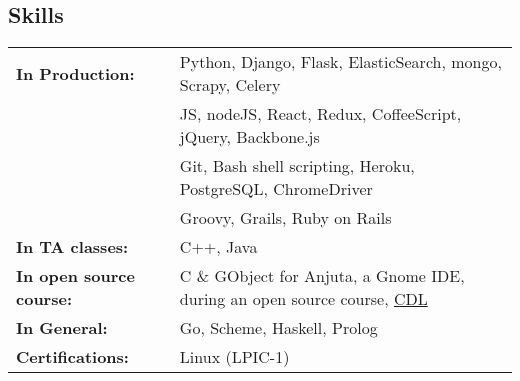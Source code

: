 \documentclass[line, margin]{resume}
\begin{document}
\begin{resume}
\section{Skills}

\begin{tabular}[t]{@{} p{1.7in} p{3.8in} @{}}
\bf{In Production:} & Python, Django, Flask, ElasticSearch, mongo, Scrapy, Celery\\
    				& JS, nodeJS, React, Redux, CoffeeScript, jQuery, Backbone.js\\
                    & Git, Bash shell scripting, Heroku, PostgreSQL, ChromeDriver\\
                    & Groovy, Grails, Ruby on Rails\\
\bf{In TA classes:} & C++, Java\\
\bf{In open source course:} & C \& GObject for Anjuta, a Gnome IDE, during an open source course, \href{http://cdl.rosedu.org/}{CDL}\\
\bf{In General:} & Go, Scheme, Haskell, Prolog\\
\bf{Certifications:} & Linux (LPIC-1)
\end{tabular}

\end{resume}
\end{document}
